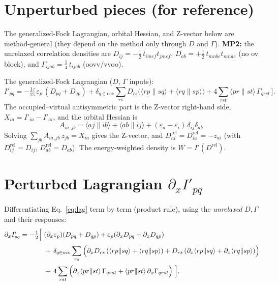 \documentclass[11pt]{article}
\newcommand{\pd}[1]{\partial_{#1}}
\newcommand{\aeri}[1]{\langle #1 \rangle}   %
\newcommand{\occ}{\mathrm{occ}}
\begin{document}
\section{Unperturbed pieces (for reference)}
The generalized-Fock Lagrangian, orbital Hessian, and Z-vector below are method-general
(they depend on the method only through $D$ and $\Gamma$). \textbf{MP2:} the unrelaxed
correlation densities are
$D_{ij}=-\tfrac12\,t_{imef}t_{jmef}$, $D_{ab}=+\tfrac12\,t_{mnbe}t_{mnae}$ (no ov block),
and $\Gamma_{ijab}=\tfrac14\,t_{ijab}$ (oovv/vvoo).

\medskip\noindent
The generalized-Fock Lagrangian ($D$, $\Gamma$ inputs):
\begin{equation}
  I'_{pq} = -\tfrac12\Big[\,
      \varepsilon_p\,(D_{pq}+D_{qp})
      + \delta_{q\in\occ}\sum_{rs} D_{rs}\big(\aeri{rp\|sq}+\aeri{rq\|sp}\big)
      + 4\sum_{rst}\aeri{pr\|st}\,\Gamma_{qrst}\,\Big].
  \label{eq:lag}
\end{equation}
The occupied--virtual antisymmetric part is the Z-vector right-hand side,
$X_{ia} = I'_{ia}-I'_{ai}$, and the orbital Hessian is
\begin{equation}
  A_{ia,jb} = \aeri{aj\|ib} + \aeri{ab\|ij} + (\varepsilon_a-\varepsilon_i)\,\delta_{ij}\delta_{ab}.
  \label{eq:hess}
\end{equation}
Solving $\sum_{jb}A_{ia,jb}\,z_{jb}=X_{ia}$ gives the Z-vector, and
$D^{\mathrm{rel}}_{ai}=D^{\mathrm{rel}}_{ia}=-z_{ai}$ (with $D^{\mathrm{rel}}_{ij}=D_{ij}$,
$D^{\mathrm{rel}}_{ab}=D_{ab}$). The energy-weighted density is $W=I'(D^{\mathrm{rel}})$.

\section{Perturbed Lagrangian $\pd{x}I'_{pq}$}
Differentiating Eq.~\eqref{eq:lag} term by term (product rule), using the \emph{unrelaxed}
$D,\Gamma$ and their responses:
\begin{align}
  \pd{x}I'_{pq} = -\tfrac12\Big[\;
      & (\pd{x}\varepsilon_p)(D_{pq}+D_{qp}) + \varepsilon_p(\pd{x}D_{pq}+\pd{x}D_{qp})
      \notag\\[2pt]
      &+\,\delta_{q\in\occ}\sum_{rs}\Big(
          \pd{x}D_{rs}\,(\aeri{rp\|sq}+\aeri{rq\|sp})
          + D_{rs}\,(\pd{x}\aeri{rp\|sq}+\pd{x}\aeri{rq\|sp})\Big)
      \notag\\[2pt]
      &+\,4\sum_{rst}\Big(
          \pd{x}\aeri{pr\|st}\,\Gamma_{qrst} + \aeri{pr\|st}\,\pd{x}\Gamma_{qrst}\Big)
      \;\Big].
  \label{eq:dlag}
\end{align}
\end{document}

